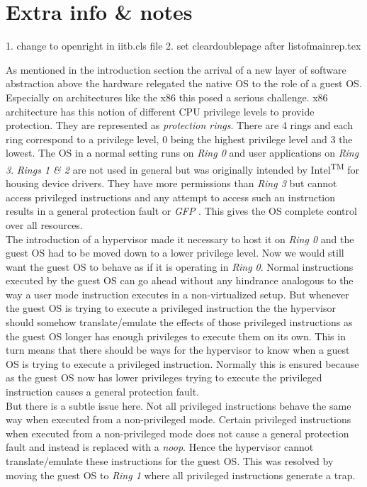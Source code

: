 \chapter{Extra info \& notes}

1. change to openright in iitb.cls file 
2. set cleardoublepage after listofmainrep.tex



As mentioned in the introduction section the arrival of a new layer of software abstraction above
the hardware relegated the native OS to the role of a guest OS. Especially on architectures like the
x86 this posed a serious challenge. x86 architecture has this notion of different CPU privilege
levels to provide protection. They are represented as \textit{protection rings}. There are 4 rings
and each ring correspond to a privilege level, 0 being the highest privilege level and 3 the lowest.
The OS in a normal setting runs on \textit{Ring 0} and user applications on \textit{Ring 3}.
\textit{Rings 1 \& 2} are not used in general but was originally intended by
Intel\textsuperscript{TM} for housing device drivers. They have more permissions than \textit{Ring
3} but cannot access privileged instructions and any attempt to access such an instruction results
in a general protection fault or \textit{GFP} \citep{wiki1}. This gives the OS complete control over
all resources.\\
The introduction of a hypervisor made it necessary to host it on \textit{Ring 0} and the guest OS
had to be moved down to a lower privilege level. Now we would still want the guest OS to behave as
if it is operating in \textit{Ring 0}. Normal instructions executed by the guest OS can go ahead
without any hindrance analogous to the way a user mode instruction executes in a non-virtualized
setup. But whenever the guest OS is trying to execute a privileged instruction the the hypervisor
should somehow translate/emulate the effects of those privileged instructions as the guest OS longer
has enough privileges to execute them on its own. This in turn means that there should be ways for
the hypervisor to know when a guest OS is trying to execute a privileged instruction. Normally this
is ensured because as the guest OS now has lower privileges trying to execute the privileged
instruction causes a general protection fault.\\
But there is a subtle issue here. Not all privileged instructions behave the same way when executed
from a non-privileged mode. Certain privileged instructions when executed from a non-privileged mode
does not cause a general protection fault and instead is replaced with a \textit{noop}. Hence the
hypervisor cannot translate/emulate these instructions for the guest OS. This was resolved by moving
the guest OS to \textit{Ring 1} where all privileged instructions generate a trap.
